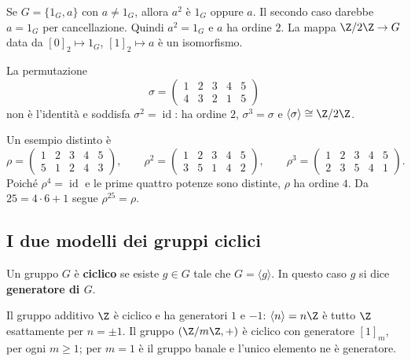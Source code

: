 \begin{esempio}
Se $G=\{1_G,a\}$ con $a\ne1_G$, allora $a^2$ è $1_G$ oppure $a$. Il secondo caso darebbe $a=1_G$ per cancellazione. Quindi $a^2=1_G$ e $a$ ha ordine $2$. La mappa $\Z/2\Z\to G$ data da $[0]_2\mapsto1_G$, $[1]_2\mapsto a$ è un isomorfismo.
\end{esempio}

\begin{esempio}
La permutazione
\[
\sigma=\begin{pmatrix}1&2&3&4&5\\4&3&2&1&5\end{pmatrix}
\]
non è l'identità e soddisfa $\sigma^2=\operatorname{id}$: ha ordine $2$, $\sigma^3=\sigma$ e $\langle\sigma\rangle\cong\Z/2\Z$.

Un esempio distinto è
\[
\rho=\begin{pmatrix}1&2&3&4&5\\5&1&2&4&3\end{pmatrix},\qquad
\rho^2=\begin{pmatrix}1&2&3&4&5\\3&5&1&4&2\end{pmatrix},\qquad
\rho^3=\begin{pmatrix}1&2&3&4&5\\2&3&5&4&1\end{pmatrix}.
\]
Poiché $\rho^4=\operatorname{id}$ e le prime quattro potenze sono distinte, $\rho$ ha ordine $4$. Da $25=4\cdot6+1$ segue $\rho^{25}=\rho$.
\end{esempio}

\subsection{I due modelli dei gruppi ciclici}
\begin{definizione}
Un gruppo $G$ è \textbf{ciclico} se esiste $g\in G$ tale che $G=\langle g\rangle$. In questo caso $g$ si dice \textbf{generatore di $G$}.
\end{definizione}

\begin{esempio}
Il gruppo additivo $\Z$ è ciclico e ha generatori $1$ e $-1$: $\langle n\rangle=n\Z$ è tutto $\Z$ esattamente per $n=\pm1$. Il gruppo $(\Z/m\Z,+)$ è ciclico con generatore $[1]_m$, per ogni $m\ge1$; per $m=1$ è il gruppo banale e l'unico elemento ne è generatore.
\end{esempio}

